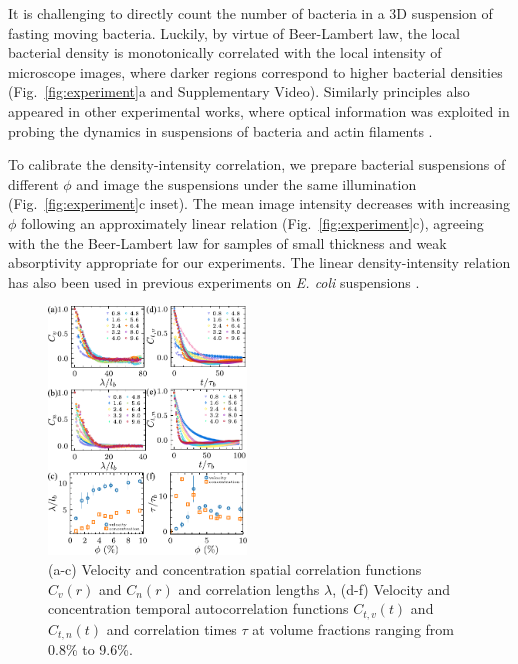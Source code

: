 \documentclass[twocolumn,aps,prl,amsmath,amssymb,longbibliography]{revtex4-2}
\begin{document}
It is challenging to directly count the number of bacteria in a 3D suspension of fasting moving bacteria. Luckily, by virtue of Beer-Lambert law, the local bacterial density is monotonically correlated with the local intensity of microscope images, where darker regions correspond to higher bacterial densities (Fig.~\ref{fig:experiment}a and Supplementary Video). Similarly principles also appeared in other experimental works, where optical information was exploited in probing the dynamics in suspensions of bacteria and actin filaments \cite{Sokolov2009, Wilson2011, Schaller2013}.



To calibrate the density-intensity correlation, we prepare bacterial suspensions of different $\phi$ and image the suspensions under the same illumination (Fig.~\ref{fig:experiment}c inset). The mean image intensity decreases with increasing $\phi$ following an approximately linear relation (Fig.~\ref{fig:experiment}c), agreeing with the the Beer-Lambert law for samples of small thickness and weak absorptivity appropriate for our experiments. The linear density-intensity relation has also been used in previous experiments on \textit{E. coli} suspensions \cite{Wilson2011}.


\begin{figure}[ht]
\begin{center}
\includegraphics[width=0.47\textwidth]{figures/spatiotemporal-correlations/v3.pdf}
\caption[spatiotemporal-correlations.]
{
(a-c) Velocity and concentration spatial correlation functions $C_{v}(r)$  and $C_{n}(r)$ and correlation lengths $\lambda$,
(d-f) Velocity and concentration temporal autocorrelation functions $C_{t, v}(t)$  and $C_{t, n}(t)$ and correlation times $\tau$ at volume fractions ranging from 0.8\% to 9.6\%.
}
\label{fig:spatiotemporal-correlations}
\end{center}
\end{figure}
\end{document}
